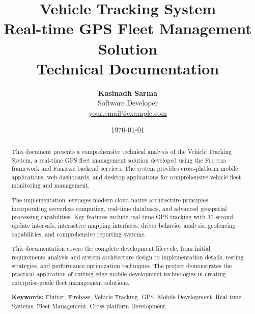 \documentclass[12pt,a4paper,twoside]{report}
\title{
    \Huge \textbf{Vehicle Tracking System} \\
    \Large Real-time GPS Fleet Management Solution \\
    \vspace{0.5cm}
    \large Technical Documentation
}
\author{
    \textbf{Kasinadh Sarma} \\
    \small Software Developer \\
    \small \href{mailto:your.email@example.com}{your.email@example.com}
}
\date{\today}
\makeatletter
\newcommand{\flutter}{\textsc{Flutter}}
\newcommand{\firebase}{\textsc{Firebase}}
\def\maketitle{%
    \null
    \thispagestyle{empty}%
    \vfill
    \begin{center}\leavevmode
        \normalfont
        {\LARGE \@title\par}%
        \hrulefill\par
        {\large \@author\par}%
        \vskip 1cm%
        {\large \@date\par}%
    \end{center}%
    \vfill
    \null
    \cleardoublepage
}
\makeatother
\begin{document}
\maketitle

\begin{abstract}
This document presents a comprehensive technical analysis of the Vehicle Tracking System, a real-time GPS fleet management solution developed using the \flutter{} framework and \firebase{} backend services. The system provides cross-platform mobile applications, web dashboards, and desktop applications for comprehensive vehicle fleet monitoring and management.

The implementation leverages modern cloud-native architecture principles, incorporating serverless computing, real-time databases, and advanced geospatial processing capabilities. Key features include real-time GPS tracking with 30-second update intervals, interactive mapping interfaces, driver behavior analysis, geofencing capabilities, and comprehensive reporting systems.

This documentation covers the complete development lifecycle, from initial requirements analysis and system architecture design to implementation details, testing strategies, and performance optimization techniques. The project demonstrates the practical application of cutting-edge mobile development technologies in creating enterprise-grade fleet management solutions.

\textbf{Keywords:} Flutter, Firebase, Vehicle Tracking, GPS, Mobile Development, Real-time Systems, Fleet Management, Cross-platform Development
\end{abstract}

\tableofcontents
\listoffigures
\listoftables
\lstlistoflistings



























\appendix







\end{document}
